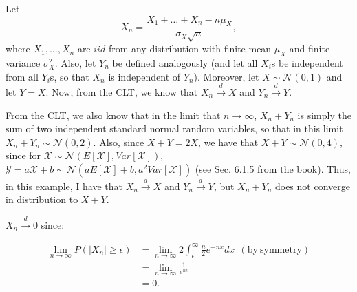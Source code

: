 \begin{problem}{12} Let 
\begin{equation*}
X_n = \frac{X_1+\ldots+X_n -n \mu_X}{\sigma_X \sqrt{n}},
\end{equation*}
where $X_1, \ldots, X_n$ are $iid$ from any distribution with finite mean $\mu_X$ and finite variance $\sigma^2_X$.  Also, let $Y_n$ be defined analogously (and let all $X_i$s be independent from all $Y_i$s, so that $X_n$ is independent of $Y_n$).  Moreover, let $X\sim \mathcal N(0, 1)$ and let $Y=X$.  Now, from the CLT, we know that $X_n \xrightarrow{d}X$ and $Y_n \xrightarrow{d}Y$.

From the CLT, we also know that in the limit that $n \rightarrow \infty$, $X_n+Y_n$ is simply the sum of two independent standard normal random variables, so that in this limit $X_n+Y_n \sim \mathcal N(0, 2)$.  Also, since $X+Y=2X$, we have that $X+Y \sim \mathcal N(0, 4)$, since for $\mathcal X \sim \mathcal N(E[\mathcal X], Var[\mathcal X])$, $\mathcal Y=a\mathcal X+b \sim \mathcal N (a E[\mathcal X]+b, a^2 Var[\mathcal X])$ (see Sec. 6.1.5 from the book).  Thus, in this example, I have that $X_n \xrightarrow{d}X$ and $Y_n \xrightarrow{d}Y$, but $X_n+Y_n$ does not converge in distribution to $X+Y$.

\end{problem}

\begin{problem}{13} $X_n \xrightarrow{d} 0$ since:

\begin{align*}
\lim_{n \rightarrow \infty} P(|X_n| \ge \epsilon) &= \lim_{n \rightarrow \infty} 2 \int_{\epsilon}^\infty \frac{n}{2}e^{-nx}dx~~\mathrm{(by~symmetry)} \\
&=\lim_{n \rightarrow \infty}  \frac{1}{e^{n \epsilon}} \\
& = 0.
\end{align*}

\end{problem}

